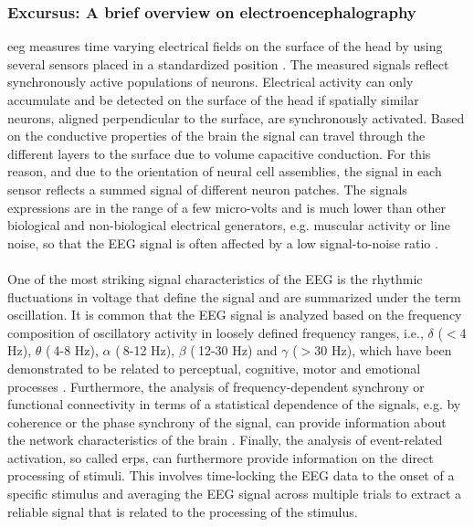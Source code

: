 \begin{tcolorbox}
    \subsubsection{Excursus: A brief overview on electroencephalography}
    \Gls{eeg} measures time varying electrical fields on the surface of the head by using several sensors placed in a standardized position \cite{Jackson2014}. The measured signals reflect synchronously active populations of neurons. Electrical activity can only accumulate and be detected on the surface of the head if spatially similar neurons, aligned perpendicular to the surface, are synchronously activated. Based on the conductive properties of the brain the signal can travel through the different layers to the surface due to volume capacitive conduction. For this reason, and due to the orientation of neural cell assemblies, the signal in each sensor reflects a summed signal of different neuron patches. The signals expressions are in the range of a few micro-volts and is much lower than other biological and non-biological electrical generators, e.g. muscular activity or line noise, so that the EEG signal is often affected by a low signal-to-noise ratio \cite{CohenX2017}.\\
    \\
    One of the most striking signal characteristics of the EEG is the rhythmic fluctuations in voltage that define the signal and are summarized under the term oscillation. It is common that the EEG signal is analyzed based on the frequency composition of oscillatory activity in loosely defined frequency ranges, i.e., $\delta$ ($<$4 Hz), $\theta$ ($~$4-8 Hz), $\alpha$ ($~$8-12 Hz), $\beta$ ($~$12-30 Hz) and $\gamma$ ($>$30 Hz), which have been demonstrated to be related to perceptual, cognitive, motor and emotional processes \cite{CohenX2017}. Furthermore, the analysis of frequency-dependent synchrony or functional connectivity in terms of a statistical dependence of the signals, e.g. by coherence or the phase synchrony of the signal, can provide information about the network characteristics of the brain \cite{Siegel2012}. Finally, the analysis of event-related activation, so called \glspl{erp}, can furthermore provide information on the direct processing of stimuli. This involves time-locking the EEG data to the onset of a specific stimulus and averaging the EEG signal across multiple trials to extract a reliable signal that is related to the processing of the stimulus.
\end{tcolorbox}

